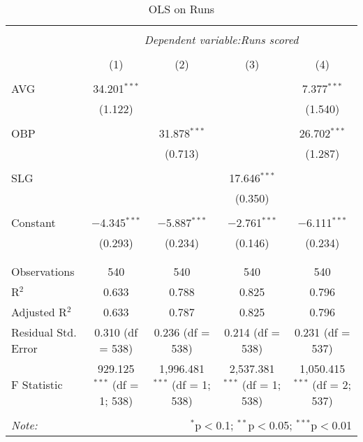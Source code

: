 
\begin{table}[!htbp] \centering
  \caption{OLS on Runs}
  \label{}
  \footnotesize
\begin{tabular}{@{\extracolsep{5pt}}lcccc}
\\[-1.8ex]\hline
\hline \\[-1.8ex]
 & \multicolumn{4}{c}{\textit{Dependent variable:Runs scored}} \\
\cline{2-5}
\\[-1.8ex] & (1) & (2) & (3) & (4)\\
\hline \\[-1.8ex]
 AVG & 34.201$^{***}$ &  &  & 7.377$^{***}$ \\
  & (1.122) &  &  & (1.540) \\
  & & & & \\
 OBP &  & 31.878$^{***}$ &  & 26.702$^{***}$ \\
  &  & (0.713) &  & (1.287) \\
  & & & & \\
 SLG &  &  & 17.646$^{***}$ &  \\
  &  &  & (0.350) &  \\
  & & & & \\
 Constant & $-$4.345$^{***}$ & $-$5.887$^{***}$ & $-$2.761$^{***}$ & $-$6.111$^{***}$ \\
  & (0.293) & (0.234) & (0.146) & (0.234) \\
  & & & & \\
\hline \\[-1.8ex]
Observations & 540 & 540 & 540 & 540 \\
R$^{2}$ & 0.633 & 0.788 & 0.825 & 0.796 \\
Adjusted R$^{2}$ & 0.633 & 0.787 & 0.825 & 0.796 \\
Residual Std. Error & 0.310 (df = 538) & 0.236 (df = 538) & 0.214 (df = 538) & 0.231 (df = 537) \\
F Statistic & 929.125$^{***}$ (df = 1; 538) & 1,996.481$^{***}$ (df = 1; 538) & 2,537.381$^{***}$ (df = 1; 538) & 1,050.415$^{***}$ (df = 2; 537) \\
\hline
\hline \\[-1.8ex]
\textit{Note:}  & \multicolumn{4}{r}{$^{*}$p$<$0.1; $^{**}$p$<$0.05; $^{***}$p$<$0.01} \\
\end{tabular}
\end{table}
